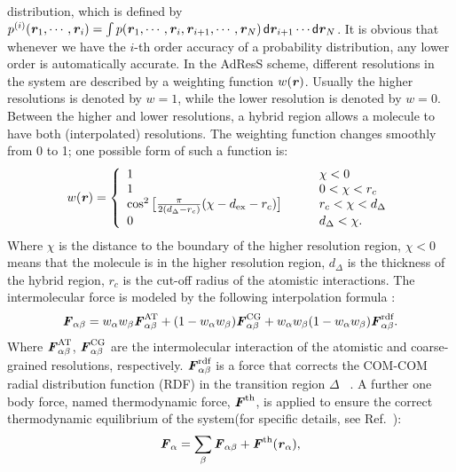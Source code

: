 \documentclass[aip,jcp,a4paper,reprint,onecolumn]{revtex4-1}
\newcommand{\vect}[1]{\textbf{\textit{#1}}}
\newcommand{\dd}[1]{\textsf{#1}}
\newcommand{\AT}{{\textrm{{AT}}}}
\newcommand{\CG}{{\textrm{CG}}}
\newcommand{\HY}{{\Delta}}
\newcommand{\rdf}{{\textrm{rdf}}}
\begin{document}
  distribution, which is defined by
  $p^{(i)}(\vect r_1, \cdots, \vect r_i)
  = \int p(\vect r_1, \cdots, \vect r_i, \vect r_{i+1}, \cdots, \vect r_N)\,
  \dd d \vect r_{i+1}\cdots\dd d \vect r_N$.
  It is obvious that
  whenever we have the $i$-th order accuracy of a probability distribution,
  any lower  order is automatically accurate.
In the AdResS scheme,
different resolutions in the system are described by a weighting
function $w(\vect r)$. Usually the higher resolutions is
denoted by $w = 1$, while the lower resolution is denoted by $w = 0$.
Between the higher and lower resolutions, a hybrid region allows a 
molecule to have both (interpolated) resolutions. The weighting function changes smoothly
from 0 to 1; one possible form of such a function is:
\begin{align}\label{eqn:new-w}
  w(\vect r) =
  \left\{
    \begin{array}{lcl}
      1 &\quad& \chi < 0\\
      1  && 0 < \chi < r_c\\
      \cos^2\big[\frac{\pi}{2(d_{\HY} - r_c)} (\chi - d_{\textrm{ex}} - r_c)\big] && r_c < \chi < d_{\HY} \\
      0 &&  d_{\HY}  < \chi.
    \end{array}
  \right.
\end{align}
Where $\chi$ is the distance to the boundary of the higher resolution
region, $\chi < 0$ means that the molecule is in the higher resolution
region, $d_{\HY}$ is the thickness of the hybrid region, $r_c$ is the
cut-off radius of the atomistic interactions.  The intermolecular force is modeled by the following
interpolation formula \cite{rdfcorr}:
\begin{align}
  \vect F_{\alpha\beta} =
  w_\alpha w_\beta\vect F^{\AT}_{\alpha\beta} +
  (1-w_\alpha w_\beta)\vect F^{\CG}_{\alpha\beta} +
  w_\alpha w_\beta (1-w_\alpha w_\beta)\vect F_{\alpha\beta}^{\rdf}.
\label{grf}
\end{align}
Where $ \vect F^{\AT}_{\alpha\beta}$, $ \vect F^{\CG}_{\alpha\beta}$
are the intermolecular interaction of the atomistic and coarse-grained
resolutions, respectively.  $\vect F_{\alpha\beta}^{\rdf}$ is a force that corrects the COM-COM radial distribution function (RDF) in the transition region $\Delta$ ~\cite{rdfcorr}. A further one body force, named thermodynamic force, ${\vect F}^{\textrm{th}}$, is applied to ensure the correct thermodynamic equilibrium of the system(for specific details, see Ref.~\cite{prlgc}):
\begin{equation}
  {\vect F}_{\alpha}=
  \sum_{\beta}{\vect F}_{\alpha\beta}+
  {\vect F}^{\textrm{th}}(\vect r_\alpha),
\label{mody}
\end{equation}
\end{document}
